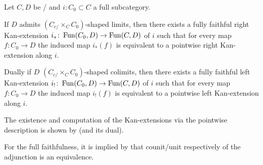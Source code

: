 \begin{prop}\label{prop:exKanExt}
    Let $C,D$ be \inftycats/ and $i\colon C_0\subset C$ a full subcategory.
    
    If $D$ admits $\left(C_{c/}\times_C C_0\right)$-shaped limits, then there exists a fully faithful right Kan-extension $i_*\colon\operatorname{Fun}(C_0,D)\to\operatorname{Fun}(C,D)$ of $i$ such that for every map $f\colon C_0\to D$ the induced map $i_*(f)$ is equivalent to a pointwise right Kan-extension along $i$.

    Dually if $D$  $\left(C_{c/}\times_C C_0\right)$-shaped colimits, then there exists a fully faithful left Kan-extension $i_!\colon\operatorname{Fun}(C_0,D)\to\operatorname{Fun}(C,D)$ of $i$ such that for every map $f\colon C_0\to D$ the induced map $i_!(f)$ is equivalent to a pointwise left Kan-extension along $i$.
    \begin{reference}
        The existence and computation of the Kan-extensions via the pointwise description is shown by \cite[Proposition 6.4.9]{cisinski_2019} (and its dual).
        
        For the full faithfulness, it is implied by \cite[Corollary 7.3.1.16]{kerodon} that counit/unit respectively of the adjunction is an equivalence.
    \end{reference}
\end{prop}
